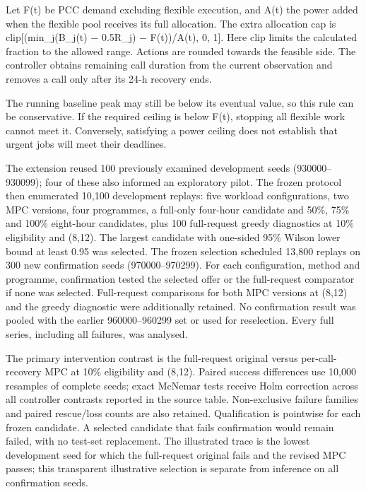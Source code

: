\documentclass[10pt,a4paper]{article}
\begin{document}
Let F(t) be PCC demand excluding flexible execution, and A(t) the power added when the flexible pool receives its full allocation. The extra allocation cap is clip[(min\_j(B\_j(t) − 0.5R\_j) − F(t))/A(t), 0, 1]. Here clip limits the calculated fraction to the allowed range. Actions are rounded towards the feasible side. The controller obtains remaining call duration from the current observation and removes a call only after its 24-h recovery ends.


The running baseline peak may still be below its eventual value, so this rule can be conservative. If the required ceiling is below F(t), stopping all flexible work cannot meet it. Conversely, satisfying a power ceiling does not establish that urgent jobs will meet their deadlines.


The extension reused 100 previously examined development seeds (930000–930099); four of these also informed an exploratory pilot. The frozen protocol then enumerated 10,100 development replays: five workload configurations, two MPC versions, four programmes, a full-only four-hour candidate and 50\%, 75\% and 100\% eight-hour candidates, plus 100 full-request greedy diagnostics at 10\% eligibility and (8,12). The largest candidate with one-sided 95\% Wilson lower bound at least 0.95 was selected. The frozen selection scheduled 13,800 replays on 300 new confirmation seeds (970000–970299). For each configuration, method and programme, confirmation tested the selected offer or the full-request comparator if none was selected. Full-request comparisons for both MPC versions at (8,12) and the greedy diagnostic were additionally retained. No confirmation result was pooled with the earlier 960000–960299 set or used for reselection. Every full series, including all failures, was analysed.


The primary intervention contrast is the full-request original versus per-call-recovery MPC at 10\% eligibility and (8,12). Paired success differences use 10,000 resamples of complete seeds; exact McNemar tests receive Holm correction across all controller contrasts reported in the source table. Non-exclusive failure families and paired rescue/loss counts are also retained. Qualification is pointwise for each frozen candidate. A selected candidate that fails confirmation would remain failed, with no test-set replacement. The illustrated trace is the lowest development seed for which the full-request original fails and the revised MPC passes; this transparent illustrative selection is separate from inference on all confirmation seeds.
\end{document}
